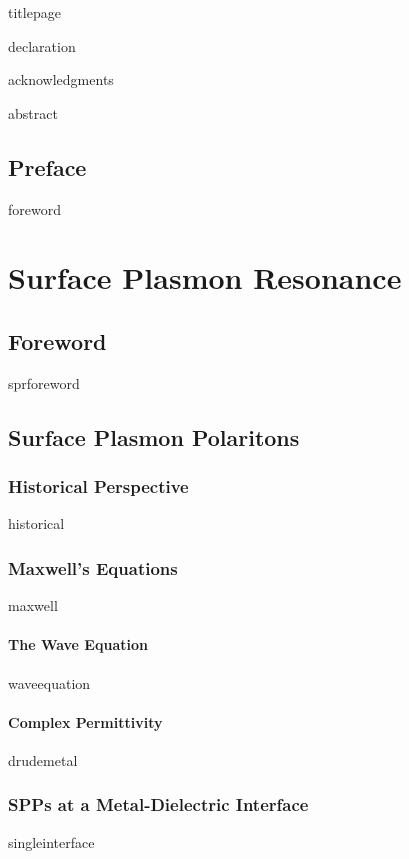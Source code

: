 \documentclass[a4paper,titlepage,onecolumn]{report}
\begin{document}
{titlepage}

{declaration}

{acknowledgments}

\tableofcontents

{abstract}



\chapter{Preface} \label{ch:foreword}
{foreword}

\part{Surface Plasmon Resonance}
\chapter{Foreword} \label{ch:sprforeword}
{sprforeword}
\chapter{Surface Plasmon Polaritons} \label{ch:existence}
 \section{Historical Perspective}
 {historical}
 \section{Maxwell's Equations}
 {maxwell}
  \subsection{The Wave Equation}
  {waveequation}
  \subsection{Complex Permittivity}
  {drudemetal}
 \section{SPPs at a Metal-Dielectric Interface}
 {singleinterface}
\end{document}
